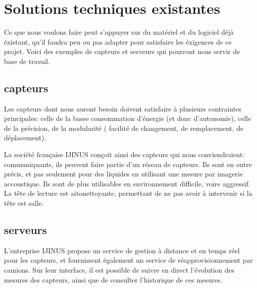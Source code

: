 \section{Solutions techniques existantes}

Ce que nous voulons faire peut s'appuyer sur du matériel et 
du logiciel déjà éxistant, qu'il faudra peu ou pas adapter pour
satisfaire les éxigences de ce projet. Voici des exemples de
capteurs et serveurs qui pourront nous servir de base de
travail.

\subsection{capteurs}

Les capteurs dont nous auront besoin doivent satisfaire à plusieurs
contraintes principales: celle de la basse consommation d'énergie
(et donc d'autonomie), celle de la précision, de la modularité (
facilité de changement, de remplacement, de déplacement).

La société française IJINUS conçoit ainsi des capteurs qui nous
conviendraient: communiquants, ils peuvent faire partie d'un
réseau de capteurs. Ils sont en outre précis, et pas seulement
pour des liquides en utilisant une mesure par imagerie accoustique.
Ils sont de plus utilisables en environnement difficile, voire aggressif.
La tête de lecture est aitonettoyante, permettant de ne pas avoir
à intervenir si la tête est salle.

\begin{figure}
\begin{center}


\end{center}
\end{figure}


\subsection{serveurs}

L'entreprise IJINUS propose un service de gestion à distance et en temps
réel pour les capteurs, et fournissent également un service de
réapprovisionnement par camions.
Sur leur interface, il est possible de suivre en direct l'évolution des
mesures des capteurs, ainsi que de consulter l'historique de ces mesures.
